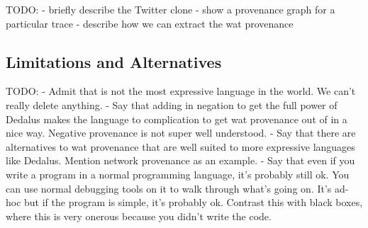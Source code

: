 TODO:
  - briefly describe the Twitter clone
  - show a provenance graph for a particular trace
  - describe how we can extract the wat provenance

{}

\subsection{Limitations and Alternatives}
TODO:
  - Admit that \dedalusplus{} is not the most expressive language in the world.
    We can't really delete anything.
  - Say that adding in negation to get the full power of Dedalus makes the
    language to complication to get wat provenance out of in a nice way.
    Negative provenance is not super well understood.
  - Say that there are alternatives to wat provenance that are well suited to
    more expressive languages like Dedalus. Mention network provenance as an
    example.
  - Say that even if you write a program in a normal programming language, it's
    probably still ok. You can use normal debugging tools on it to walk through
    what's going on. It's ad-hoc but if the program is simple, it's probably
    ok.  Contrast this with black boxes, where this is very onerous because you
    didn't write the code.
